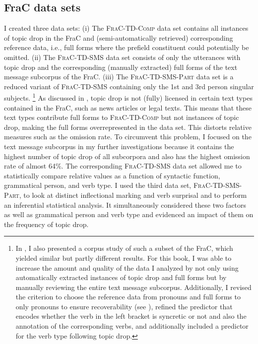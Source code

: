 \subsection{FraC data sets}\label{sec:frac.data.sets}
I created three data sets:
(i) The \textsc{FraC-TD-Comp} data set contains all instances of topic drop in the FraC and (semi-automatically retrieved) corresponding reference data, i.e., full forms where the prefield constituent could potentially be omitted.
(ii) The \textsc{FraC-TD-SMS} data set consists of only the utterances with topic drop and the corresponding (manually extracted) full forms of the text message subcorpus of the FraC.
(iii) The \textsc{FraC-TD-SMS-Part} data set is a reduced variant of \textsc{FraC-TD-SMS} containing only the 1st and 3rd person singular subjects.%
\footnote{In \citet{schafer2021}, I also presented a corpus study of such a subset of the FraC, which yielded similar but partly different results.
For this book, I was able to increase the amount and quality of the data I analyzed by not only using automatically extracted instances of topic drop and full forms but by manually reviewing the entire text message subcorpus.
Additionally, I revised the criterion to choose the reference data from pronouns and full forms to only pronouns to ensure recoverability  (see ), refined the predictor that encodes whether the verb in the left bracket is syncretic  or not and also the annotation of the corresponding verbs, and additionally included a predictor for the verb type following topic drop.
}
As discussed in , topic drop is not (fully) licensed in certain text types  contained in the FraC, such as news articles or legal texts.
This means that these text types contribute full forms to \textsc{FraC-TD-Comp} but not instances of topic drop, making the full forms overrepresented in the data set.
This distorts relative measures such as the omission rate.
To circumvent this problem, I focused on the text message subcorpus in my further investigations because it contains the highest number of topic drop of all subcorpora and also has the highest omission rate of almost 64\%.
The corresponding \textsc{FraC-TD-SMS} data set allowed me to statistically compare relative values as a function of syntactic function, grammatical person, and verb type.
I used the third data set, \textsc{FraC-TD-SMS-Part}, to look at distinct inflectional marking and verb surprisal and to perform an inferential statistical analysis.
It simultaneously considered these two factors as well as grammatical person and verb type and evidenced an impact of them on the frequency of topic drop.

